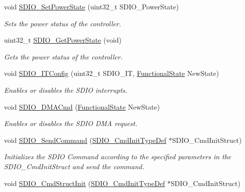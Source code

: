 \begin{DoxyCompactItemize}
void \mbox{\hyperlink{group___s_d_i_o___private___functions_ga36ecca32b904de74218fbe65cd5f5270}{S\+D\+I\+O\+\_\+\+Set\+Power\+State}} (uint32\+\_\+t S\+D\+I\+O\+\_\+\+Power\+State)
\begin{DoxyCompactList}\small\item\em Sets the power status of the controller. \end{DoxyCompactList}\item 
uint32\+\_\+t \mbox{\hyperlink{group___s_d_i_o___private___functions_ga3a19de2c7cd51645702213f64a1758ed}{S\+D\+I\+O\+\_\+\+Get\+Power\+State}} (void)
\begin{DoxyCompactList}\small\item\em Gets the power status of the controller. \end{DoxyCompactList}\item 
void \mbox{\hyperlink{group___s_d_i_o___private___functions_ga208f51237ef43288735829dbaed37f00}{S\+D\+I\+O\+\_\+\+I\+T\+Config}} (uint32\+\_\+t S\+D\+I\+O\+\_\+\+IT, \mbox{\hyperlink{group___exported__types_gac9a7e9a35d2513ec15c3b537aaa4fba1}{Functional\+State}} New\+State)
\begin{DoxyCompactList}\small\item\em Enables or disables the S\+D\+IO interrupts. \end{DoxyCompactList}\item 
void \mbox{\hyperlink{group___s_d_i_o___private___functions_gad36fde5ec0ce0c2089b9d971c2271e6e}{S\+D\+I\+O\+\_\+\+D\+M\+A\+Cmd}} (\mbox{\hyperlink{group___exported__types_gac9a7e9a35d2513ec15c3b537aaa4fba1}{Functional\+State}} New\+State)
\begin{DoxyCompactList}\small\item\em Enables or disables the S\+D\+IO D\+MA request. \end{DoxyCompactList}\item 
void \mbox{\hyperlink{group___s_d_i_o___private___functions_ga7117d2f702703f6c0a66bc07707cab23}{S\+D\+I\+O\+\_\+\+Send\+Command}} (\mbox{\hyperlink{struct_s_d_i_o___cmd_init_type_def}{S\+D\+I\+O\+\_\+\+Cmd\+Init\+Type\+Def}} $\ast$S\+D\+I\+O\+\_\+\+Cmd\+Init\+Struct)
\begin{DoxyCompactList}\small\item\em Initializes the S\+D\+IO Command according to the specified parameters in the S\+D\+I\+O\+\_\+\+Cmd\+Init\+Struct and send the command. \end{DoxyCompactList}\item 
void \mbox{\hyperlink{group___s_d_i_o___private___functions_ga09d9e89f49c87c82aec79c97b7068e24}{S\+D\+I\+O\+\_\+\+Cmd\+Struct\+Init}} (\mbox{\hyperlink{struct_s_d_i_o___cmd_init_type_def}{S\+D\+I\+O\+\_\+\+Cmd\+Init\+Type\+Def}} $\ast$S\+D\+I\+O\+\_\+\+Cmd\+Init\+Struct)

\end{DoxyCompactItemize}
